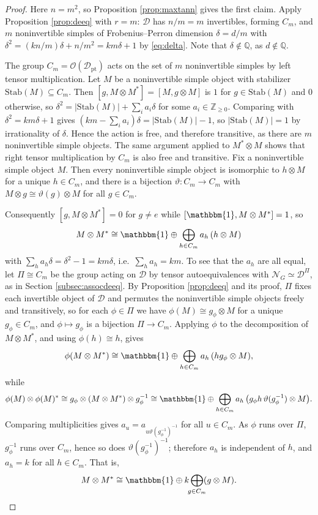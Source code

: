 \documentclass[10pt]{article}
\theoremstyle{plain}
\theoremstyle{definition}
\theoremstyle{plain}
\begin{document}
\begin{proof}
Here $n=m^{2}$, so Proposition \ref{prop:maxtann} gives the first
claim.  Apply Proposition \ref{prop:deeq} with $r=m$:
$\mathcal{D}$ has $n/m=m$ invertibles, forming $C_m$, and $m$ noninvertible simples of Frobenius--Perron dimension
$\delta=d/m$ with $\delta^{2}=(kn/m)\delta+n/m^{2}=km\delta+1$ by
\eqref{eq:delta}.  Note that $\delta\notin\mathbb{Q}$, as $d\notin\mathbb{Q}$.

The group $C_m=\mathcal{O}(\mathcal{D}_\mathrm{pt})$ acts on the set of $m$ noninvertible
simples by left tensor multiplication. Let $M$ be a noninvertible simple object with stabilizer $\mathrm{Stab}(M)\subseteq C_m$.  Then $[g,M\otimes M^{*}]=[M,g\otimes M]$ is $1$ for $g\in\mathrm{Stab}(M)$ and $0$ otherwise, so
$\delta^{2}=|\mathrm{Stab}(M)|+\sum_ia_i\delta$ for some $a_i\in\mathbb{Z}_{\ge0}$.  Comparing
with $\delta^{2}=km\delta+1$ gives $(km-\sum_ia_i)\delta=|\mathrm{Stab}(M)|-1$, so $|\mathrm{Stab}(M)|=1$ by
irrationality of $\delta$.  Hence the action is free, and therefore transitive, as there are $m$ noninvertible simple objects.  The same argument applied to $M^\ast\otimes M$ shows that
right tensor multiplication by $C_m$ is also free and transitive.  Fix a
noninvertible simple object $M$.  Then every noninvertible simple object is
isomorphic to $h\otimes M$ for a unique $h\in C_m$, and there is a bijection
$\vartheta:C_m\to C_m$ with $M\otimes g\cong\vartheta(g)\otimes M$ for all $g\in C_m$.

Consequently $[g,M\otimes M^{*}]=0$ for $g\neq e$ while
$[\mathbbm{1},M\otimes M^{*}]=1$, so
\[
  M\otimes M^{*}\cong\mathbbm{1}\oplus\bigoplus_{h\in C_m}a_h\,(h\otimes M)
\]
with $\sum_ha_h\delta=\delta^{2}-1=km\delta$, i.e.\ $\sum_ha_h=km$.  To see that
the $a_h$ are all equal, let $\Pi\cong C_m$ be the group acting on $\mathcal{D}$
by tensor autoequivalences with $\mathcal{N}_G\simeq\mathcal{D}^{\Pi}$, as in Section \ref{subsec:assocdeeq}.  By Proposition \ref{prop:deeq} and its proof, $\Pi$ fixes each invertible object of $\mathcal{D}$ and permutes the noninvertible
simple objects freely and transitively, so for each $\phi\in\Pi$ we have
$\phi(M)\cong g_\phi\otimes M$ for a unique $g_\phi\in C_m$, and
$\phi\mapsto g_\phi$ is a bijection $\Pi\to C_m$.  Applying $\phi$ to the
decomposition of $M\otimes M^\ast$, and using $\phi(h)\cong h$, gives
\[
  \phi(M\otimes M^{*})\cong\mathbbm{1}\oplus\bigoplus_{h\in C_m}a_h\,(hg_\phi\otimes M),
\]
while
\[
  \phi(M)\otimes\phi(M)^{*}\cong g_\phi\otimes(M\otimes M^{*})\otimes g_\phi^{-1}
  \cong\mathbbm{1}\oplus\bigoplus_{h\in C_m}a_h\,\bigl(g_\phi h\,\vartheta(g_\phi^{-1})\otimes M\bigr).
\]
Comparing multiplicities gives $a_u=a_{u\vartheta(g_\phi^{-1})^{-1}}$ for all
$u\in C_m$.  As $\phi$ runs over $\Pi$, $g_\phi^{-1}$ runs over $C_m$, hence so
does $\vartheta(g_\phi^{-1})^{-1}$; therefore $a_h$ is independent of $h$, and
$a_h=k$ for all $h\in C_m$. That is,
\begin{equation}\label{eq:haag}
  M\otimes M^{*}\cong\mathbbm{1}\oplus k\!\!\bigoplus_{g\in C_m}\!\!(g\otimes M).
\end{equation}


\end{proof}
\end{document}
